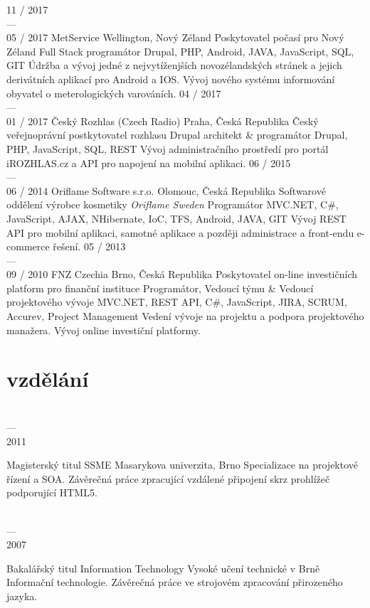 \documentclass[]{friggeri-cv} %
\begin{document}
\begin{entrylist}
  \job
  {11 / 2017 \\ --- \\ 05 / 2017}
  {MetService}
  {Wellington, Nový Zéland}
  {Poskytovatel počasí pro Nový Zéland}
  {
    \position
    {Full Stack programátor}
    {Drupal, PHP, Android, JAVA, JavaScript, SQL, GIT}
    {
      Údržba a vývoj jedné z nejvytíženjších novozélandských stránek a jejich derivátních aplikací pro Android a IOS.
      Vývoj nového systému informování obyvatel o meterologických varováních.
    }
  }
  \job
  {04 / 2017 \\ --- \\ 01 / 2017}
  {Český Rozhlas (Czech Radio)}
  {Praha, Česká Republika}
  {Český veřejnoprávní postkytovatel rozhlasu}
  {
    \position
      {Drupal architekt \& programátor}
      {Drupal, PHP, JavaScript, SQL, REST}
      {
        Vývoj administračního prostředí pro portál iROZHLAS.cz a API pro napojení na mobilní aplikaci.
      }
  }
  \job
  {06 / 2015 \\ --- \\ 06 / 2014}
  {Oriflame Software s.r.o.}
  {Olomouc, Česká Republika}
  {Softwarové oddělení výrobce kosmetiky \emph{Oriflame Sweden}}
  {
    \position
    {Programátor}
    {MVC.NET, C\#, JavaScript, AJAX, NHibernate, IoC, TFS, Android, JAVA, GIT}
    {Vývoj REST API pro mobilní aplikaci, samotné aplikace a později administrace a front-endu e-commerce řešení.}
  }
  \job
  {05 / 2013 \\ --- \\ 09 / 2010}
  {FNZ Czechia}
  {Brno, Česká Republika}
  {Poskytovatel on-line investičních platform pro finanční instituce}
  {
    \position
    {Programátor, Vedoucí týmu \& Vedoucí projektového vývoje}
    {MVC.NET, REST API, C\#, JavaScript, JIRA, SCRUM, Accurev, Project Management}
    {Vedení vývoje na projektu a podpora projektového manažera. Vývoj online investiční platformy.}
  }
\end{entrylist}

\section{vzdělání}

\begin{entrylist}
  \entry
  {\parbox[t]{2cm}{ \\ --- \\ 2011}}
  {Magisterský titul {\normalfont SSME}}
  {Masarykova univerzita, Brno}
  {
    \thesis
    {Specializace na projektové řízení a SOA.}
    {Závěrečná práce zpracující vzdálené připojení skrz prohlížeč podporující HTML5.}
  }
  \entry
  {\parbox[t]{2cm}{ \\ --- \\ 2007}}
  {Bakalářský titul {\normalfont Information Technology}}
  {Vysoké učení technické v Brně}
  {
    \thesis
    {Informační technologie.}
    {Závěrečná práce ve strojovém zpracování přirozeného jazyka.}
  }
\end{entrylist}
\end{document}
